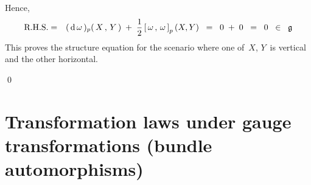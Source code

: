 Hence,
\begin{eqnarray*}
\textnormal{R.H.S.}
& = &
	(\,\textnormal{d}\,\omega\,)_{p}\!\left(\,X\,,\,Y\,\right)
	\; + \;
	\dfrac{1}{2}\left[\,\omega\,,\,\omega\,\right]_{p}(X,Y)
\;\; = \;\;
	0 \; + \; 0
\;\; = \;\;
	0
\;\; \in \;\;
	\mathfrak{g}
\end{eqnarray*}
This proves the structure equation for the scenario
where one of \,$X$, $Y$\, is vertical and the other horizontal.

\qed


\vskip 0.5cm
\section{Transformation laws under gauge transformations (bundle automorphisms)}


